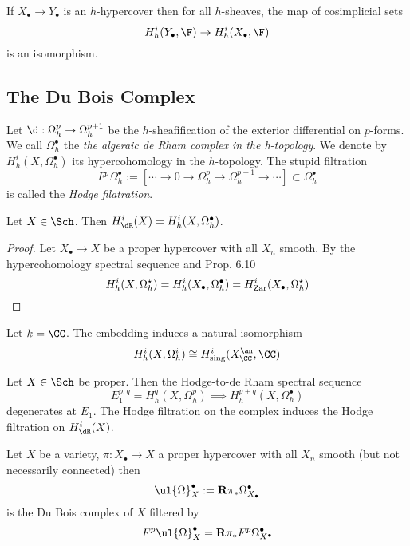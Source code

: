 \documentclass[12pt]{article}
\begin{document}
\begin{prop}
If $X_\bullet \to Y_\bullet$ is an $h$-hypercover then for all $h$-sheaves, the map of cosimplicial sets
\[ H_h^i(Y_\bullet, \F) \to H^i_h(X_\bullet, \F) \]
is an isomorphism.
\end{prop}

\subsection{The Du Bois Complex}

Let $\d : \Omega^p_h \to \Omega^{p+1}_h$ be the $h$-sheafification of the exterior differential on $p$-forms. We call $\Omega_h^\bullet$ the \textit{the algeraic de Rham complex in the h-topology}. We denote by $H_h^i(X, \Omega^\bullet_h)$ its hypercohomology in the $h$-topology. The stupid filtration
\[ F^p \Omega^\bullet_h := [ \cdots \to 0 \to \Omega^p_h \to \Omega_h^{p+1} \to \cdots] \subset \Omega^\bullet_h \]
is called the \textit{Hodge filatration}.

\begin{prop}
Let $X \in \Sch$. Then $H^i_{\dR}(X) = H_h^i(X, \Omega_h^\bullet)$.
\end{prop}

\begin{proof}
Let $X_\bullet \to X$ be a proper hypercover with all $X_n$ smooth. By the hypercohomology spectral sequence and Prop. 6.10
\[ H^i_h(X, \Omega_h^\star) = H^i_h(X_\bullet, \Omega^\bullet_h) = H^i_{\mathrm{Zar}}(X_\bullet, \Omega^\star_h) \]
\end{proof}

\begin{cor}
Let $k = \CC$. The embedding induces a natural isomorphism
\[ H^i_h(X, \Omega_h^i) \cong H^i_{\text{sing}}(X_{\CC}^\an, \CC) \]
\end{cor}

\begin{theorem}[Theorem 7.7]
Let $X \in \Sch$ be proper. Then the Hodge-to-de Rham spectral sequence
\[ E_1^{p,q} = H^q_h(X, \Omega_h^p) \implies H^{p+q}_h(X, \Omega^\bullet_h) \]
degenerates at $E_1$. The Hodge filtration on the complex induces the Hodge filtration on $H_{\dR}^i(X)$.
\end{theorem}

\begin{defn}
Let $X$ be a variety, $\pi : X_\bullet \to X$ a proper hypercover with all $X_n$ smooth (but not necessarily connected) then
\[ \ul{\Omega}_X^\bullet := \R \pi_* \Omega^\bullet_{X_\bullet} \]
is the Du Bois complex of $X$ filtered by
\[ F^p \ul{\Omega}_X^{\bullet} = \R \pi_* F^p \Omega^\bullet_{X^\bullet} \]
\end{defn}
\end{document}
